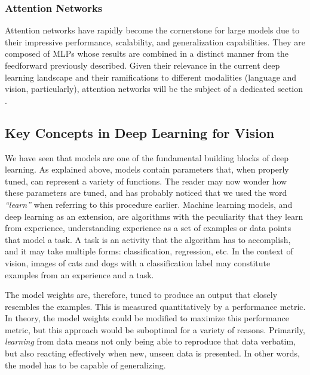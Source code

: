 \subsubsection{Attention Networks}
Attention networks have rapidly become the cornerstone for large models due to their impressive performance, scalability, and generalization capabilities. They are composed of MLPs whose results are combined in a distinct manner from the feedforward previously described. Given their relevance in the current deep learning landscape and their ramifications to different modalities (language and vision, particularly), attention networks will be the subject of a dedicated section .

\subsection{Key Concepts in Deep Learning for Vision}

We have seen that models are one of the fundamental building blocks of deep learning. As explained above, models contain parameters that, when properly tuned, can represent a variety of functions. The reader may now wonder how these parameters are tuned, and has probably noticed that we used the word \textit{``learn''} when referring to this procedure earlier. Machine learning models, and deep learning as an extension, are algorithms with the peculiarity that they learn from experience, understanding experience as a set of examples or data points that model a task. A task is an activity that the algorithm has to accomplish, and it may take multiple forms: classification, regression, etc. In the context of vision, images of cats and dogs with a classification label may constitute examples from an experience and a task.

The model weights are, therefore, tuned to produce an output that closely resembles the examples. This is measured quantitatively by a performance metric. In theory, the model weights could be modified to maximize this performance metric, but this approach would be suboptimal for a variety of reasons. Primarily, \textit{learning} from data means not only being able to reproduce that data verbatim, but also reacting effectively when new, unseen data is presented. In other words, the model has to be capable of generalizing.

